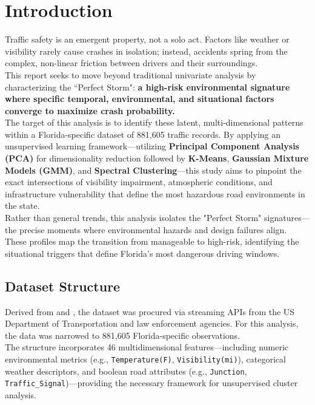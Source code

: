 \documentclass[conference]{IEEEtran}
\begin{document}
\section{\textbf{Introduction}}
Traffic safety is an emergent property, not a solo act. Factors like weather or visibility rarely cause crashes in isolation; instead, accidents spring from the complex, non-linear friction between drivers and their surroundings.\\
\indent This report seeks to move beyond traditional univariate analysis by characterizing the ``Perfect Storm": \textbf{a high-risk environmental signature where specific temporal, environmental, and situational factors converge to maximize crash probability.}\\
\indent The target of this analysis is to identify these latent, multi-dimensional patterns within a Florida-specific dataset of 881,605 traffic records. By applying an unsupervised learning framework—utilizing \textbf{Principal Component Analysis (PCA)} for dimensionality reduction followed by \textbf{K-Means}, \textbf{Gaussian Mixture Models (GMM)}, and \textbf{Spectral Clustering}—this study aims to pinpoint the exact intersections of visibility impairment, atmospheric conditions, and infrastructure vulnerability that define the most hazardous road environments in the state.\\
\indent Rather than general trends, this analysis isolates the "Perfect Storm" signatures—the precise moments where environmental hazards and design failures align. These profiles map the transition from manageable to high-risk, identifying the situational triggers that define Florida’s most dangerous driving windows.

\subsection{\textbf{Dataset Structure}}
\indent Derived from \cite{moosavi2019countrywide} and \cite{moosavi2019accident}, the dataset was procured via streaming APIs from the US Department of Transportation and law enforcement agencies. For this analysis, the data was narrowed to 881,605 Florida-specific observations.\\
\indent The structure incorporates 46 multidimensional features—including numeric environmental metrics (e.g., \texttt{Temperature(F)}, \texttt{Visibility(mi)}), categorical weather descriptors, and boolean road attributes (e.g., \texttt{Junction}, \texttt{Traffic\_Signal})—providing the necessary framework for unsupervised cluster analysis.
\end{document}
